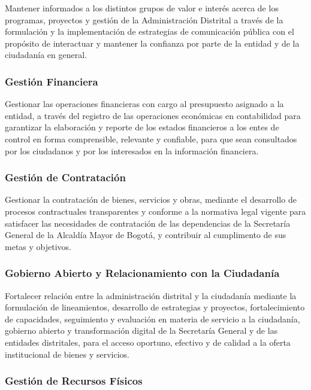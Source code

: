 \documentclass[
	a4paper, %
	12pt, %
]{include/CSSullivanBusinessReport}
\begin{document}
Mantener informados a los distintos grupos de valor e interés acerca de
los programas, proyectos y gestión de la Administración Distrital a
través de la formulación y la implementación de estrategias de
comunicación pública con el propósito de interactuar y mantener la
confianza por parte de la entidad y de la ciudadanía en general.

\subsubsection{Gestión Financiera}\label{sec:gestiuxf3n-financiera}

Gestionar las operaciones financieras con cargo al presupuesto asignado
a la entidad, a través del registro de las operaciones económicas en
contabilidad para garantizar la elaboración y reporte de los estados
financieros a los entes de control en forma comprensible, relevante y
confiable, para que sean consultados por los ciudadanos y por los
interesados en la información financiera.

\subsubsection{Gestión de
Contratación}\label{sec:gestiuxf3n-de-contrataciuxf3n}

Gestionar la contratación de bienes, servicios y obras, mediante el
desarrollo de procesos contractuales transparentes y conforme a la
normativa legal vigente para satisfacer las necesidades de contratación
de las dependencias de la Secretaría General de la Alcaldía Mayor de
Bogotá, y contribuir al cumplimento de sus metas y objetivos.

\subsubsection{Gobierno Abierto y Relacionamiento con la
Ciudadanía}\label{sec:gobierno-abierto-y-relacionamiento-con-la-ciudadanuxeda}

Fortalecer relación entre la administración distrital y la ciudadanía
mediante la formulación de lineamientos, desarrollo de estrategias y
proyectos, fortalecimiento de capacidades, seguimiento y evaluación en
materia de servicio a la ciudadanía, gobierno abierto y transformación
digital de la Secretaría General y de las entidades distritales, para el
acceso oportuno, efectivo y de calidad a la oferta institucional de
bienes y servicios.

\subsubsection{Gestión de Recursos
Físicos}\label{sec:gestiuxf3n-de-recursos-fuxedsicos}
\end{document}
